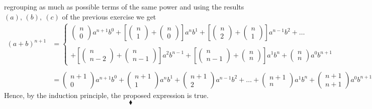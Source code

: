 regrouping as much as possible terms of the same power and using the results $(a),\, (b),\ (c)$ of the previous exercise we get
\begin{align*}
(a + b)^{n+1}&=\left\{\begin{array}{l}\left(\begin{matrix}n\\ 0\end{matrix}\right)a^{n+1}b^{0}+\left[\left(\begin{matrix}n\\ 1\end{matrix}\right)+\left(\begin{matrix}n\\ 0\end{matrix}\right)\right]a^{n}b^{1}+\left[\left(\begin{matrix}n\\ 2\end{matrix}\right)+\left(\begin{matrix}n\\ 1\end{matrix}\right)\right]a^{n-1}b^{2}+\dots \\\\
+\left[\left(\begin{matrix}n\\ n-2\end{matrix}\right)+\left(\begin{matrix}n\\ n-1\end{matrix}\right)\right]a^{2}b^{n-1}+\left[\left(\begin{matrix}n\\ n-1\end{matrix}\right)+\left(\begin{matrix}n\\ n\end{matrix}\right)\right]a^{1}b^{n}+\left(\begin{matrix}n\\ n\end{matrix}\right)a^{0}b^{n+1}\end{array}
\right.\\\\
&= \left(\begin{matrix}n+1\\ 0\end{matrix}\right)a^{n+1}b^{0}+\left(\begin{matrix}n+1\\ 1\end{matrix}\right)a^{n}b^{1}+\left(\begin{matrix}n+1\\ 2\end{matrix}\right)a^{n-1}b^{2}+\dots +\left(\begin{matrix}n+1\\n\end{matrix}\right)a^{1}b^{n}+\left(\begin{matrix}n+1\\ n+1\end{matrix}\right)a^{0}b^{n+1}
\end{align*}
Hence, by the induction principle, the proposed expression is true.
$$\blacklozenge$$

